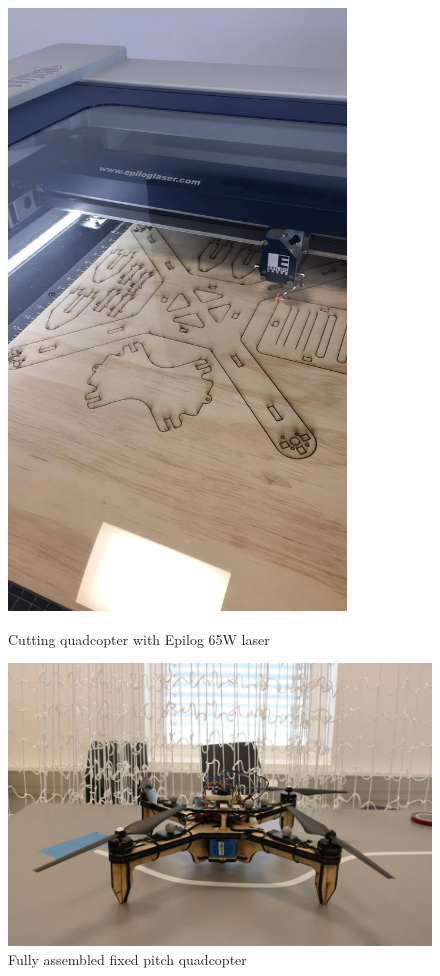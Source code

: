 \begin{figure}[h]
        \centering
         \begin{minipage}[b]{0.3\textwidth}
            \includegraphics[width = 0.8\textwidth]{VAPIQ-PICTURES/LaserCut}
              \caption{Cutting quadcopter with Epilog 65W laser}
            \label{fig:CarbonFPQ}
        \end{minipage}
        \hfill
        \begin{minipage}[b]{0.67\textwidth}
            \includegraphics[width = \textwidth]{VAPIQ-PICTURES/AssembledFPQ}
            \caption{Fully assembled fixed pitch quadcopter}
            \label{fig:Assey}
        \end{minipage}
\end{figure}


